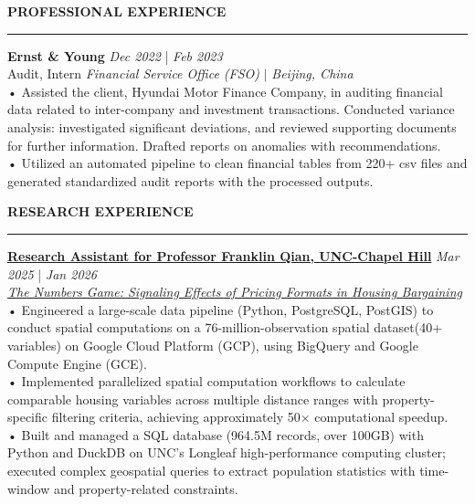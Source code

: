 \documentclass{resume} %
\renewcommand{\sectionskip}{\vspace{0.10cm}}        %
\renewcommand{\sectionlineskip}{\vspace{0.10cm}}
\renewenvironment{rSection}[1]{
\sectionskip
\textcolor{UC San Diego Blue}{\textbf{\large\bfseries\MakeUppercase{#1}}}

\sectionlineskip
\hrule
\begin{list}{}{
\setlength{\leftmargin}{0em}
}
\item[]
}{
\end{list}
}
\begin{document}
\begin{rSection}{PROFESSIONAL EXPERIENCE}
\textbf{Ernst \& Young} \hfill {\em Dec 2022} | {\em Feb 2023} \\
Audit, Intern \hfill \textit{Financial Service Office (FSO)} $|$ \textit{Beijing, China} \\[4pt]
• Assisted the client, Hyundai Motor Finance Company, in auditing financial data related to inter-company and investment transactions. Conducted variance analysis: investigated significant deviations, and reviewed supporting documents for further information. Drafted reports on anomalies with recommendations.\\[1.5pt] 
• Utilized an automated pipeline to clean financial tables from 220+ csv files and generated standardized audit reports with the processed outputs.

\end{rSection}


\begin{rSection}{RESEARCH EXPERIENCE}
\noindent
\textbf{\href{https://github.com/YuankaiTao-super/Construction-of-Comparable-Housing-Variables}{Research Assistant for Professor Franklin Qian, UNC-Chapel Hill}} \hfill {\em Mar 2025} | {\em Jan 2026}\\
\textit{\href{https://papers.ssrn.com/sol3/papers.cfm?abstract_id=4406954}{The Numbers Game: Signaling Effects of Pricing Formats in Housing Bargaining}}\\[4pt]
• Engineered a large-scale data pipeline (Python, PostgreSQL, PostGIS) to conduct spatial computations on a 76-million-observation spatial dataset(40+ variables) on Google Cloud Platform (GCP), using BigQuery and Google Compute Engine (GCE).\\[1.5pt]
• Implemented parallelized spatial computation workflows to calculate comparable housing variables across multiple distance ranges with property-specific filtering criteria, achieving approximately 50$\times$ computational speedup.\\[1.5pt]
• Built and managed a SQL database (964.5M records, over 100GB) with Python and DuckDB on UNC's Longleaf high-performance computing cluster; executed complex geospatial queries to extract population statistics with time-window and property-related constraints.
\end{rSection}
\end{document}
